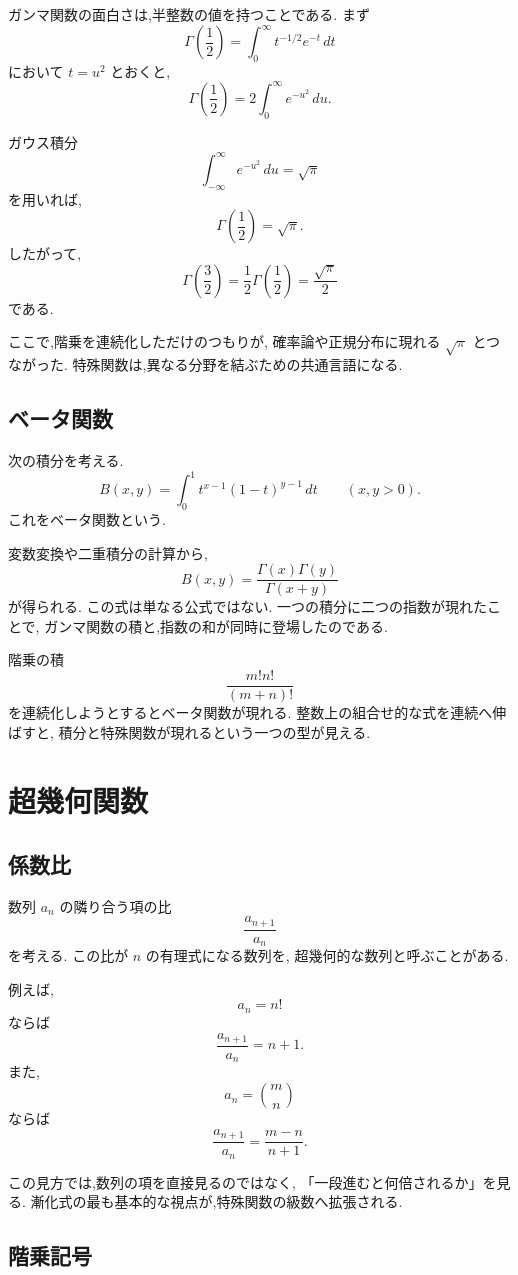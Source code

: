 ガンマ関数の面白さは,半整数の値を持つことである.
まず
\[
  \Gamma\left(\frac12\right)
  =\int_0^\infty t^{-1/2}e^{-t}\,dt
\]
において $t=u^2$ とおくと,
\[
  \Gamma\left(\frac12\right)
  =2\int_0^\infty e^{-u^2}\,du.
\]

ガウス積分
\[
  \int_{-\infty}^{\infty}e^{-u^2}\,du=\sqrt{\pi}
\]
を用いれば,
\[
  \Gamma\left(\frac12\right)=\sqrt{\pi}.
\]
したがって,
\[
  \Gamma\left(\frac32\right)
  =\frac12\Gamma\left(\frac12\right)
  =\frac{\sqrt{\pi}}2
\]
である.

ここで,階乗を連続化しただけのつもりが,
確率論や正規分布に現れる $\sqrt{\pi}$ とつながった.
特殊関数は,異なる分野を結ぶための共通言語になる.

\subsection{ベータ関数}

次の積分を考える.
\[
  B(x,y)=\int_0^1 t^{x-1}(1-t)^{y-1}\,dt
  \qquad (x,y>0).
\]
これをベータ関数という.

変数変換や二重積分の計算から,
\[
  B(x,y)=\frac{\Gamma(x)\Gamma(y)}{\Gamma(x+y)}
\]
が得られる.
この式は単なる公式ではない.
一つの積分に二つの指数が現れたことで,
ガンマ関数の積と,指数の和が同時に登場したのである.

階乗の積
\[
  \frac{m!n!}{(m+n)!}
\]
を連続化しようとするとベータ関数が現れる.
整数上の組合せ的な式を連続へ伸ばすと,
積分と特殊関数が現れるという一つの型が見える.

\section{超幾何関数}

\subsection{係数比}

数列 $a_n$ の隣り合う項の比
\[
  \frac{a_{n+1}}{a_n}
\]
を考える.
この比が $n$ の有理式になる数列を,
超幾何的な数列と呼ぶことがある.

例えば,
\[
  a_n=n!
\]
ならば
\[
  \frac{a_{n+1}}{a_n}=n+1.
\]
また,
\[
  a_n=\binom{m}{n}
\]
ならば
\[
  \frac{a_{n+1}}{a_n}
  =\frac{m-n}{n+1}.
\]

この見方では,数列の項を直接見るのではなく,
「一段進むと何倍されるか」を見る.
漸化式の最も基本的な視点が,特殊関数の級数へ拡張される.

\subsection{階乗記号}


